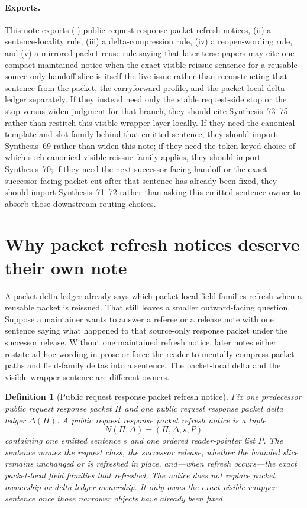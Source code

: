 \documentclass[11pt]{article}
\newtheorem{definition}{Definition}
\begin{document}
\paragraph{Exports.}
This note exports (i) public request response packet refresh notices, (ii) a sentence-locality rule, (iii) a delta-compression rule, (iv) a reopen-wording rule, and (v) a mirrored packet-reuse rule saying that later terse papers may cite one compact maintained notice when the exact visible reissue sentence for a reusable source-only handoff slice is itself the live issue rather than reconstructing that sentence from the packet, the carryforward profile, and the packet-local delta ledger separately. If they instead need only the stable request-side stop or the stop-versus-widen judgment for that branch, they should cite Synthesis~73--75 rather than restitch this visible wrapper layer locally. If they need the canonical template-and-slot family behind that emitted sentence, they should import Synthesis~69 rather than widen this note; if they need the token-keyed choice of which such canonical visible reissue family applies, they should import Synthesis~70; if they need the next successor-facing handoff or the exact successor-facing packet cut after that sentence has already been fixed, they should import Synthesis~71--72 rather than asking this emitted-sentence owner to absorb those downstream routing choices.

\section{Why packet refresh notices deserve their own note}
A packet delta ledger already says which packet-local field families refresh when a reusable packet is reissued.
That still leaves a smaller outward-facing question.
Suppose a maintainer wants to answer a referee or a release note with one sentence saying what happened to that source-only response packet under the successor release.
Without one maintained refresh notice, later notes either restate ad hoc wording in prose or force the reader to mentally compress packet paths and field-family deltas into a sentence.
The packet-local delta and the visible wrapper sentence are different owners.

\begin{definition}[Public request response packet refresh notice]
Fix one predecessor public request response packet $\Pi$ and one public request response packet delta ledger $\Delta(\Pi)$.
A \emph{public request response packet refresh notice} is a tuple
\[
N(\Pi,\Delta)=(\Pi,\Delta,s,P)
\]
containing one emitted sentence $s$ and one ordered reader-pointer list $P$.
The sentence names the request class, the successor release, whether the bounded slice remains unchanged or is refreshed in place, and---when refresh occurs---the exact packet-local field families that refreshed.
The notice does not replace packet ownership or delta-ledger ownership.
It only owns the exact visible wrapper sentence once those narrower objects have already been fixed.
\end{definition}
\end{document}
